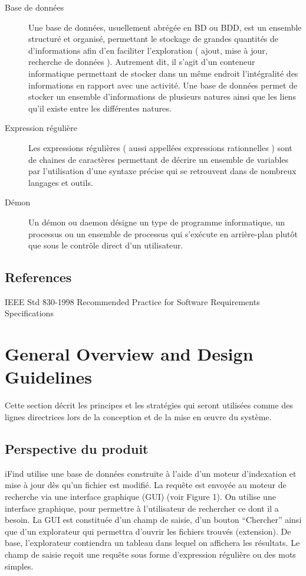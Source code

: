 \documentclass[a4paper,10pt]{article}
\begin{document}
\begin{description}
\item[Base de données]
 Une base de données, usuellement abrégée en BD ou BDD, est un ensemble
structuré et organisé, permettant le stockage de grandes quantités de
d'informations afin d'en faciliter l'exploration ( ajout, mise à jour, recherche
de données ). Autrement dit, il s’agit d’un conteneur informatique permettant de
stocker dans un même endroit l'intégralité des informations en rapport avec une
activité. Une base de données permet de stocker un ensemble d'informations de
plusieurs natures ainsi que les liens qu'il existe entre les différentes
natures.

\item[Expression régulière]
 Les expressions régulières ( aussi appellées expressions rationnelles ) sont de
chaines de caractères permettant de décrire un ensemble de variables par
l'utilisation d'une syntaxe précise qui se retrouvent dans de nombreux langages
et outils.
 
\item[Démon]
 Un démon ou daemon désigne un type de programme informatique, un processus ou
un ensemble de processus qui s'exécute en arrière-plan plutôt que sous le
contrôle direct d'un utilisateur.
\end{description}

\subsection{References}
IEEE Std 830-1998 Recommended Practice for Software Requirements Specifications 



\section{General Overview and Design Guidelines}
Cette section décrit les principes et les stratégies qui seront utilisées comme
des lignes directrices lors de la conception et de la mise en œuvre du système.

\subsection{Perspective du produit}
iFind utilise une base de données construite à l'aide d'un moteur d'indexation
et mise à jour dès qu'un fichier est modifié. 
La requête est envoyée au moteur de recherche via une interface graphique (GUI)
(voir Figure 1). 
On utilise une interface graphique, pour permettre à l’utilisateur de rechercher
ce dont il a besoin.
La GUI est constituée d’un champ de saisie, d’un bouton “Chercher” ainsi que
d’un explorateur qui permettra d’ouvrir les fichiers trouvés (extension). 
De base, l’explorateur contiendra un tableau dans lequel on affichera les
résultats. 
Le champ de saisie reçoit une requête sous forme d’expression régulière ou des
mots simples. 
\end{document}
